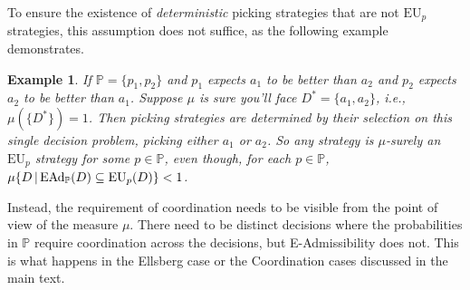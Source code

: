 \documentclass[a4paper,final]{article}
\newtheorem{example}[theorem]{Example}
\renewcommand\P{\mathbb{P}} %
\newcommand\EU{\mathrm{EU}}
\newcommand\EAd{\mathrm{EAd}}
\newcommand{\IP}{\P}
\newcommand\SetDelimiter[1][]{
	\nonscript\,#1\vert \allowbreak \nonscript\,\mathopen{}}
\providecommand\given{\SetDelimiter}
\newenvironment{CCM rewritten}
{\begingroup\color{blue}} %
{\endgroup}              %
\begin{document}
To ensure the existence of \emph{deterministic} picking strategies that are not $\EU_p$ strategies, this assumption does not suffice, as the following example demonstrates.
\begin{example}
	If $\IP=\{p_1,p_2\}$ and $p_1$ expects $a_1$ to be better than $a_2$ and $p_2$ expects $a_2$ to be better than $a_1$. Suppose $\mu$ is sure you'll face $D^*=\{a_1,a_2\}$, i.e., $\mu(\{D^*\}) = 1$. Then picking strategies are determined by their selection on this single decision problem, picking either $a_1$ or $a_2$. So any strategy is $\mu$-surely an $\EU_p$ strategy for some $p \in \IP$, even though, for each $p \in \IP$, $\mu\{D\given \EAd_\IP(D)\subseteq\EU_p(D)\}< 1$. 
\end{example}

Instead, the requirement of coordination needs to be visible from the point of view of the measure $\mu$. There need to be distinct decisions where the probabilities in $\IP$  require coordination across the decisions, but E-Admissibility does not. This is what happens in the Ellsberg case or the Coordination cases discussed in the main text. 
\end{document}
